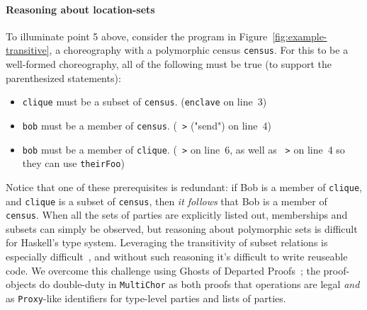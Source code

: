 \documentclass[sigplan,screen,review,anonymous]{acmart}
\newcommand{\inlinecode}[2][haskell]{\texttt{#2}}
\newcommand{\MultiChor}{\texttt{Multi\-Chor}\xspace}
\begin{document}
\paragraph{Reasoning about location-sets}
To illuminate point 5 above, consider the program in Figure~\ref{fig:example-transitive},
a choreography with a polymorphic census \inlinecode{census}.
For this to be a well-formed choreography, all of the following must be true
(to support the parenthesized statements):
\begin{itemize}
    \item \inlinecode{clique} must be a subset of \inlinecode{census}.
          (\inlinecode{enclave} on line~3)
    \item \inlinecode{bob} must be a member of \inlinecode{census}.
          (\inlinecode{~>} ("send") on line~4)
    \item \inlinecode{bob} must be a member of \inlinecode{clique}.
          (\inlinecode{~>} on line~6, as well as \inlinecode{~>} on line~4 so they can use \inlinecode{theirFoo})
\end{itemize}
Notice that one of these prerequisites is redundant:
if Bob is a member of \inlinecode{clique}, and \inlinecode{clique} is a subset of \inlinecode{census},
then \emph{it follows} that Bob is a member of \inlinecode{census}.
When all the sets of parties are explicitly listed out, memberships and subsets can simply be observed,
but reasoning about polymorphic sets is difficult for Haskell's type system.
Leveraging the transitivity of subset relations is especially difficult~\cite{stackoverflow2021},
and without such reasoning it's difficult to write reuseable code.
We overcome this challenge using Ghosts of Departed Proofs~\cite{noonanGDP};
the proof-objects do double-duty in \MultiChor as both proofs that operations are legal \emph{and}
as \inlinecode{Proxy}-like identifiers for type-level parties and lists of parties.
\end{document}
